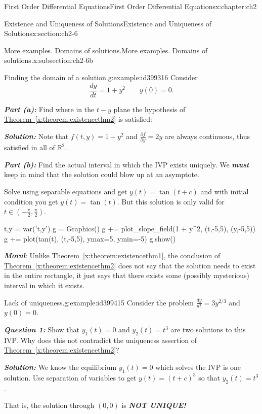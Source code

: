 \documentclass[oneside,10pt,]{book}
\newcommand{\xreffont}{\relax}
\newcommand{\alert}[1]{\textbf{\textit{#1}}}
\numberwithin{equation}{section}
\numberwithin{equation}{section}
\begin{document}
\begin{chapterptx}{First Order Differential Equations}{}{First Order Differential Equations}{}{}{x:chapter:ch2}
\begin{sectionptx}{Existence and Uniqueness of Solutions}{}{Existence and Uniqueness of Solutions}{}{}{x:section:ch2-6}
\begin{subsectionptx}{More examples. Domains of solutions.}{}{More examples. Domains of solutions.}{}{}{x:subsection:ch2-6b}
\begin{example}{Finding the domain of a solution.}{g:example:id399316}%
Consider%
\begin{equation*}
\frac{dy}{dt}=1+y^{2}\qquad y(0)=0.
\end{equation*}
%
\par
\alert{Part (a):} Find where in the \(t-y\) plane the hypothesis of \hyperref[x:theorem:existencethm2]{Theorem~{\xreffont\ref{x:theorem:existencethm2}}} is satisfied:%
\par
\alert{Solution:} Note that \(f(t,y)=1+y^{2}\) and \(\frac{\partial f}{\partial y}=2y\) are always continuous, thus satisfied in all of \(\mathbb{R}^{2}\).%
\par
\alert{Part (b):} Find the actual interval in which the IVP exists uniquely. We \alert{must} keep in mind that the solution could blow up at an asymptote.%
\par
Solve using separable equations and get \(y(t)=\tan(t+c)\) and with initial condition you get \(y(t)=\tan(t)\). But this solution is only valid for \(t\in\left(-\frac{\pi}{2},\frac{\pi}{2}\right)\).%
\begin{sageinput}
t,y = var('t,y')
g = Graphics()
g += plot_slope_field(1 + y^2, (t,-5,5), (y,-5,5))
g += plot(tan(t), (t,-5,5), ymax=5, ymin=-5)
g.show()
\end{sageinput}
\alert{Moral}: Unlike \hyperref[x:theorem:existencethm1]{Theorem~{\xreffont\ref{x:theorem:existencethm1}}}, the conclusion of \hyperref[x:theorem:existencethm2]{Theorem~{\xreffont\ref{x:theorem:existencethm2}}} does not say that the solution needs to exist in the entire rectangle, it just says that there exists some (possibly mysterious) interval in which it exists.%
\end{example}
\begin{example}{Lack of uniqueness.}{g:example:id399415}%
Consider the problem \(\frac{dy}{dt}=3y^{2/3}\) and \(y(0)=0\).%
\par
\alert{Question 1:} Show that \(y_{1}(t)=0\) and \(y_{2}(t)=t^{3}\) are two solutions to this IVP. Why does this not contradict the uniqueness assertion of \hyperref[x:theorem:existencethm2]{Theorem~{\xreffont\ref{x:theorem:existencethm2}}}?%
\par
\alert{Solution:} We know the equilibrium \(y_{1}(t)=0\) which solves the IVP is one solution. Use separation of variables to get \(y(t)=(t+c)^{3}\) so that \(y_{2}(t)=t^{3}\).%
\par
That is, the solution through \((0,0)\) is \alert{NOT UNIQUE!}%
\par

\end{example}
\end{subsectionptx}
\end{sectionptx}
\end{chapterptx}
\end{document}
